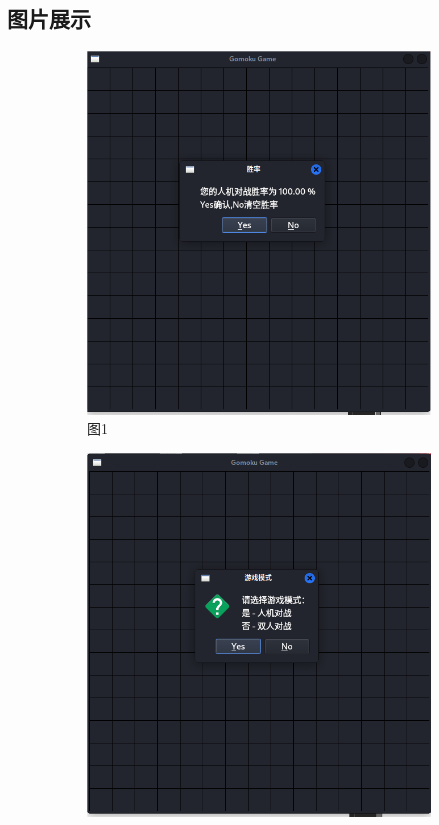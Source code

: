 \documentclass[UTF8]{ctexart}
\begin{document}
\subsection{图片展示}
\begin{figure}[htbp]
    \centering
    \begin{subfigure}[b]{0.3\textwidth}
        \centering
        \includegraphics[width=\textwidth]{screenshoot1.png}
        \caption{图1}
        \label{fig:image1}
    \end{subfigure}%
    \hfill
    \begin{subfigure}[b]{0.3\textwidth}
        \centering
        \includegraphics[width=\textwidth]{screenshoot2.png}

\end{subfigure}
\end{figure}
\end{document}
